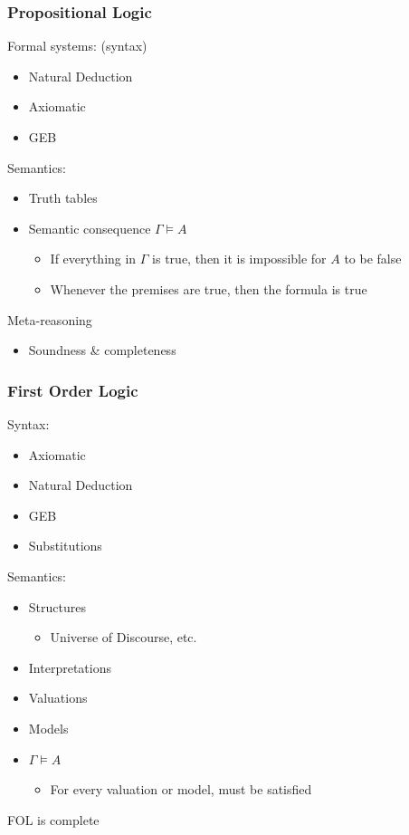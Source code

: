 \documentclass[11pt]{article}
\begin{document}
\subsubsection{Propositional Logic}
\label{sec:org2533671}
Formal systems: (syntax)
\begin{itemize}
\item Natural Deduction
\item Axiomatic
\item GEB
\end{itemize}
Semantics:
\begin{itemize}
\item Truth tables
\item Semantic consequence \(\Gamma \models A\)
\begin{itemize}
\item If everything in \(\Gamma\) is true, then it is impossible for \(A\) to be false
\item Whenever the premises are true, then the formula is true
\end{itemize}
\end{itemize}
Meta-reasoning
\begin{itemize}
\item Soundness \& completeness
\end{itemize}
\subsubsection{First Order Logic}
\label{sec:org684af6c}
Syntax:
\begin{itemize}
\item Axiomatic
\item Natural Deduction
\item GEB
\item Substitutions
\end{itemize}
Semantics:
\begin{itemize}
\item Structures
\begin{itemize}
\item Universe of Discourse, etc.
\end{itemize}
\item Interpretations
\item Valuations
\item Models
\item \(\Gamma \models A\)
\begin{itemize}
\item For every valuation or model, must be satisfied
\end{itemize}
\end{itemize}
FOL is complete
\end{document}
